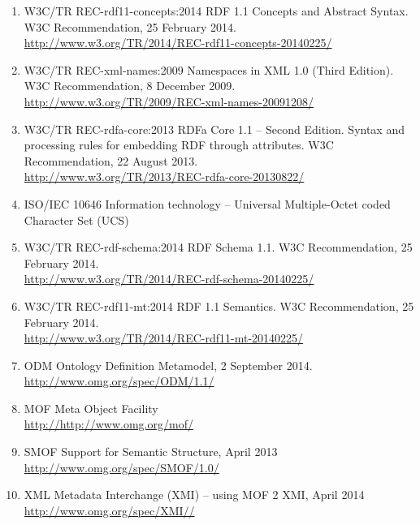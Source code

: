 \documentclass[10pt,fleqn,%
\ifpretendfinal
final%
\else
draft%
\fi,
]{scrreprt}
\begin{document}
\begin{enumerate}
  \item{W3C/TR REC-rdf11-concepts:2014} {RDF 1.1 Concepts and Abstract Syntax.  W3C Recommendation, 25 February 2014. \\ \url{http://www.w3.org/TR/2014/REC-rdf11-concepts-20140225/}}
  \item{W3C/TR REC-xml-names:2009} {Namespaces in XML 1.0 (Third Edition). W3C Recommendation, 8 December 2009.\\
   \url{http://www.w3.org/TR/2009/REC-xml-names-20091208/}}
  \item{W3C/TR REC-rdfa-core:2013} {RDFa Core 1.1 -- Second Edition.  Syntax and processing rules for embedding RDF through attributes. W3C Recommendation, 22 August 2013.\\ \url{http://www.w3.org/TR/2013/REC-rdfa-core-20130822/}}
  \item{ISO/IEC 10646} {Information technology – Universal Multiple-Octet coded Character Set (UCS)}
  \item{W3C/TR REC-rdf-schema:2014} {RDF Schema 1.1. W3C Recommendation, 25 February 2014.\\ \url{http://www.w3.org/TR/2014/REC-rdf-schema-20140225/}}
  \item{W3C/TR REC-rdf11-mt:2014} {RDF 1.1 Semantics.  W3C Recommendation, 25 February 2014. \\ \url{http://www.w3.org/TR/2014/REC-rdf11-mt-20140225/}}
  \item{ODM} {Ontology Definition Metamodel, 2 September 2014. \\ \url{http://www.omg.org/spec/ODM/1.1/}}
\item{MOF} { Meta Object Facility} \\ \url{http://http://www.omg.org/mof/}
\item{SMOF} { Support for Semantic Structure, April 2013} \\ \url{http://www.omg.org/spec/SMOF/1.0/}
\item{XML} {Metadata Interchange (XMI) – using MOF 2 XMI, April 2014} \\ \url{http://www.omg.org/spec/XMI//}

\end{enumerate}
\end{document}
